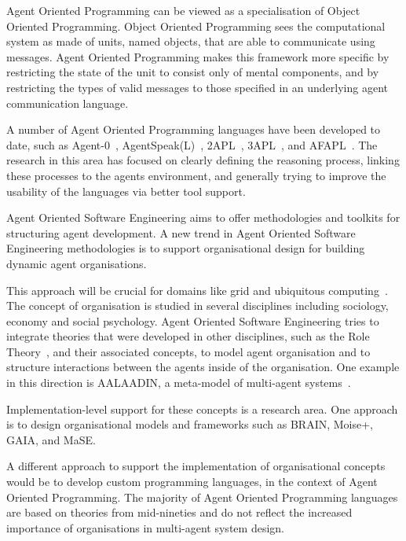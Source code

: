 \documentclass[a4paper,12pt,oneside,fleqn]{book} %
\theoremstyle{plain}
\theoremstyle{definition}
\theoremstyle{remark}
\begin{document}
Agent Oriented Programming can be viewed as a specialisation of Object
Oriented Programming\null. Object Oriented Programming sees the
computational system as made of units, named objects, that are able to
communicate using messages. Agent Oriented Programming makes this framework
more specific by restricting the state of the unit to consist only of
mental components, and by restricting the types of valid messages to those
specified in an underlying agent communication language.

A number of Agent Oriented Programming languages have been developed to
date, such as Agent-0~\cite{DBLP:journals/ai/Shoham93},
AgentSpeak(L)~\cite{DBLP:conf/maamaw/Rao96},
2APL~\cite{DBLP:journals/aamas/Dastani08},
3APL~\cite{DBLP:conf/promas/DastaniRDM03}, and
AFAPL~\cite{DBLP:conf/seke/CollierOR04}. The research in this area has
focused on clearly defining the reasoning process, linking these processes
to the agents environment, and generally trying to improve the usability of
the languages via better tool support.

Agent Oriented Software Engineering aims to offer methodologies and
toolkits for structuring agent development. A new trend in Agent Oriented
Software Engineering methodologies is to support organisational design for
building dynamic agent organisations.

This approach will be crucial for domains like grid and ubiquitous
computing~\cite{luck2005agent}. The concept of organisation is studied in
several disciplines including sociology, economy and social psychology.
Agent Oriented Software Engineering tries to integrate theories that were
developed in other disciplines, such as the Role
Theory~\cite{biddle1986recent}, and their associated concepts, to model
agent organisation and to structure interactions between the agents inside
of the organisation. One example in this direction is AALAADIN, a
meta-model of multi-agent systems~\cite{ferber1998meta}.

Implementation-level support for these concepts is a research area. One
approach is to design organisational models and frameworks such as BRAIN, Moise+, GAIA, and MaSE.

A different approach to support the implementation of organisational
concepts would be to develop custom programming languages, in the context
of Agent Oriented Programming. The majority of Agent Oriented Programming
languages are based on theories from mid-nineties and do not reflect the
increased importance of organisations in multi-agent system design.
\end{document}

